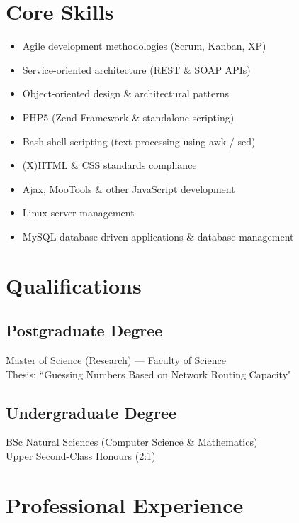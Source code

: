 \documentclass{cv}
\begin{document}
\section{Core Skills}

\begin{itemize}
\item Agile development methodologies (Scrum, Kanban, XP)
\item Service-oriented architecture (REST \& SOAP APIs)
\item Object-oriented design \& architectural patterns
\item PHP5 (Zend Framework \& standalone scripting)
\item Bash shell scripting (text processing using awk / sed)
\item (X)HTML \& CSS standards compliance
\item Ajax, MooTools \& other JavaScript development
\item Linux server management
\item MySQL database-driven applications \& database management
\end{itemize}

\section{Qualifications}

\subsection*{Postgraduate Degree}

Master of Science (Research) --- Faculty of Science\\
Thesis: ``Guessing Numbers Based on Network Routing Capacity"

\subsection*{Undergraduate Degree}

BSc Natural Sciences (Computer Science \& Mathematics)\\
Upper Second-Class Honours (2:1)

\section{Professional Experience}
\end{document}
